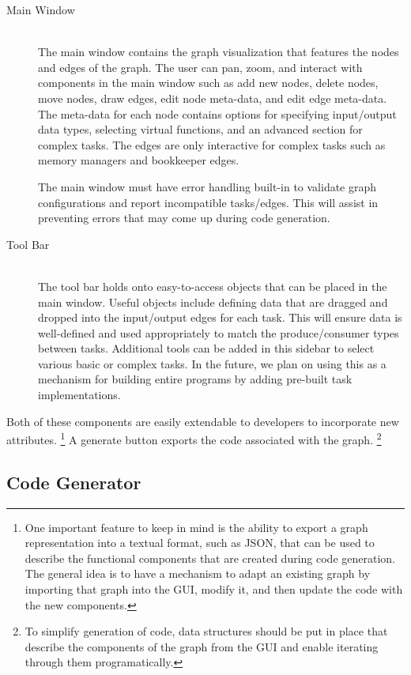 \documentclass[]{article}
\begin{document}
\begin{description}
\item[Main Window] \hfill \\
	The main window contains the graph visualization that features the nodes and edges of the graph. The user can pan, zoom, and interact with components in the main window such as add new nodes, delete nodes, move nodes, draw edges, edit node meta-data, and edit edge meta-data. The meta-data for each node contains options for specifying input/output data types, selecting virtual functions, and an advanced section for complex tasks. The edges are only interactive for complex tasks such as memory managers and bookkeeper edges. 
	
	The main window must have error handling built-in to validate graph configurations and report incompatible tasks/edges. This will assist in preventing errors that may come up during code generation.


\item[Tool Bar] \hfill \\
	The tool bar holds onto easy-to-access objects that can be placed in the main window. Useful objects include defining data that are dragged and dropped into the input/output edges for each task. This will ensure data is well-defined and used appropriately to match the produce/consumer types between tasks. Additional tools can be added in this sidebar to select various basic or complex tasks. In the future, we plan on using this as a mechanism for building entire programs by adding pre-built task implementations.

\end{description}

Both of these components are easily extendable to developers to incorporate new attributes. \footnote{One important feature to keep in mind is the ability to export a graph representation into a textual format, such as JSON, that can be used to describe the functional components that are created during code generation. The general idea is to have a mechanism to adapt an existing graph by importing that graph into the GUI, modify it, and then update the code with the new components.} A generate button exports the code associated with the graph. \footnote{To simplify generation of code, data structures should be put in place that describe the components of the graph from the GUI and enable iterating through them programatically.}


\subsection{Code Generator}
\end{document}
